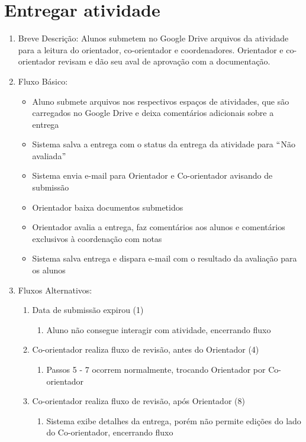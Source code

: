 \section{Entregar atividade}
\begin{enumerate}
    \item Breve Descrição: Alunos submetem no Google Drive arquivos da atividade para a leitura do orientador, co-orientador e coordenadores. Orientador e co-orientador revisam e dão seu aval de aprovação com a documentação.
    \item Fluxo Básico:
    \begin{itemize}
        \item Aluno submete arquivos nos respectivos espaços de atividades, que são carregados no Google Drive e deixa comentários adicionais sobre a entrega
        \item Sistema salva a entrega com o status da entrega da atividade para $``$Não avaliada$"$
        \item Sistema envia e-mail para Orientador e Co-orientador avisando de submissão
        \item Orientador baixa documentos submetidos
        \item Orientador avalia a entrega, faz comentários aos alunos e comentários exclusivos à coordenação com notas
        \item Sistema salva entrega e dispara e-mail com o resultado da avaliação para os alunos
    \end{itemize}
    \item Fluxos Alternativos:
    \begin{enumerate}
        \item Data de submissão expirou (1)
        \begin{enumerate}
            \item Aluno não consegue interagir com atividade, encerrando fluxo
        \end{enumerate}
        \item Co-orientador realiza fluxo de revisão, antes do Orientador (4)
        \begin{enumerate}
            \item Passos 5 - 7 ocorrem normalmente, trocando Orientador por Co-orientador
        \end{enumerate}
        \item Co-orientador realiza fluxo de revisão, após Orientador (8)
        \begin{enumerate}
            \item Sistema exibe detalhes da entrega, porém não permite edições do lado do Co-orientador, encerrando fluxo

\end{enumerate}
\end{enumerate}
\end{enumerate}
